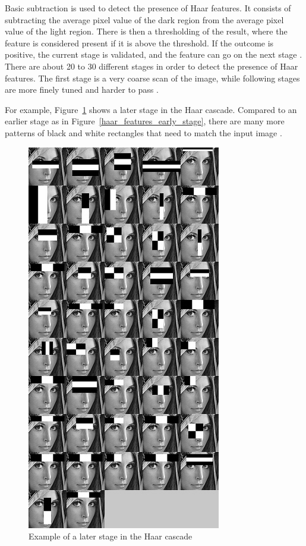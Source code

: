 \noindent Basic subtraction is used to detect the presence of Haar features. It consists of subtracting the average pixel value of the dark region from the average pixel value of the light region. There is then a thresholding of the result, where the feature is considered present if it is above the threshold. If the outcome is positive, the current stage is validated, and the feature can go on the next stage \cite{HEW07}. There are about 20 to 30 different stages in order to detect the presence of Haar features. The first stage is a very coarse scan of the image, while following stages are more finely tuned and harder to pass \cite{HAR12}.
\newline

\noindent For example, Figure~\ref{haar_feature_later_stage} shows a later stage in the Haar cascade. Compared to an earlier stage as in Figure~\ref{haar_features_early_stage}, there are many more patterns of black and white rectangles that need to match the input image \cite{HAR12}.
\newline

\begin{figure}[!h]
\begin{center}
\noindent \includegraphics[scale=0.8]{figures/haar_feature_later_stage} 
\newline
\caption{Example of a later stage in the Haar cascade}
\label{haar_feature_later_stage}
\end{center} 
\end{figure}

